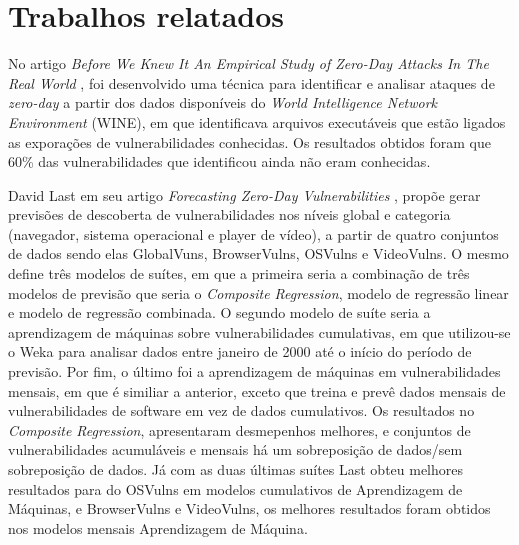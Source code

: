 \section{Trabalhos relatados}

No artigo \textit{Before We Knew It An Empirical Study of Zero-Day Attacks In The Real World} \cite{Bilge:2012}, foi desenvolvido uma 
técnica para identificar e analisar ataques de \textit{zero-day} a partir dos dados disponíveis do \textit{World Intelligence Network 
Environment} (WINE), em que identificava arquivos executáveis que estão ligados as exporações de vulnerabilidades conhecidas. Os resultados obtidos foram que 60\% das vulnerabilidades que identificou ainda não eram conhecidas. 

David Last em seu artigo \textit{Forecasting Zero-Day Vulnerabilities} \cite{Last:2016}, propõe gerar previsões de descoberta de 
vulnerabilidades nos níveis global e categoria (navegador, sistema operacional e player de vídeo), a partir de quatro conjuntos de dados 
sendo elas GlobalVuns, BrowserVulns, OSVulns e VideoVulns. O mesmo define três modelos de suítes, em que a primeira 
seria a combinação de três modelos de previsão que seria o \textit{Composite Regression}, modelo de regressão linear e modelo de 
regressão combinada. O segundo modelo de suíte seria a aprendizagem de máquinas sobre vulnerabilidades cumulativas, em que utilizou-se o 
Weka para analisar dados entre janeiro de 2000 até o início do período de previsão. Por fim, o último foi a aprendizagem de máquinas em 
vulnerabilidades mensais, em que é similiar a anterior, exceto que treina e prevê dados mensais de vulnerabilidades de software em vez de 
dados cumulativos. Os resultados no \textit{Composite Regression}, apresentaram desmepenhos melhores, e conjuntos de vulnerabilidades 
acumuláveis e mensais há um sobreposição de dados/sem sobreposição de dados. Já com as duas últimas suítes Last obteu melhores resultados 
para do OSVulns em modelos cumulativos de Aprendizagem de Máquinas, e BrowserVulns e VideoVulns, os melhores resultados foram obtidos nos 
modelos mensais Aprendizagem de Máquina.

